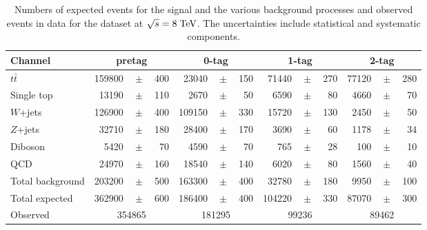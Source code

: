 \begin{table}
  \begin{tabular}{ l  rrr  rrr  rrr  rrr }
    \toprule
    Channel & \multicolumn{3}{c}{\ejets{} pretag} & \multicolumn{3}{c}{\ejets{} 0-tag} & \multicolumn{3}{c}{\ejets{} 1-tag} & \multicolumn{3}{c}{\ejets{} 2-tag} \\
    \midrule
    $t\bar{t}$       & 159800 &$\!\!\!\pm\!\!\!$& 400  & 23040 &$\!\!\!\pm\!\!\!$& 150  & 71440 &$\!\!\!\pm\!\!\!$& 270  & 77120 &$\!\!\!\pm\!\!\!$& 280  \\
    Single top       & 13190  &$\!\!\!\pm\!\!\!$& 110  & 2670  &$\!\!\!\pm\!\!\!$& 50  & 6590  &$\!\!\!\pm\!\!\!$& 80  & 4660  &$\!\!\!\pm\!\!\!$& 70   \\
    $W$+jets  & 126900 &$\!\!\!\pm\!\!\!$& 400 & 109150  &$\!\!\!\pm\!\!\!$& 330  & 15720 &$\!\!\!\pm\!\!\!$& 130  & 2450  &$\!\!\!\pm\!\!\!$& 50  \\
    $Z$+jets         & 32710  &$\!\!\!\pm\!\!\!$& 180  & 28400   &$\!\!\!\pm\!\!\!$& 170   & 3690  &$\!\!\!\pm\!\!\!$& 60  & 1178   &$\!\!\!\pm\!\!\!$& 34   \\
    Diboson          & 5420  &$\!\!\!\pm\!\!\!$& 70   & 4590  &$\!\!\!\pm\!\!\!$& 70 & 765 &$\!\!\!\pm\!\!\!$& 28 & 100  &$\!\!\!\pm\!\!\!$& 10 \\
    QCD       & 24970  &$\!\!\!\pm\!\!\!$& 160  & 18540  &$\!\!\!\pm\!\!\!$& 140  & 6020  &$\!\!\!\pm\!\!\!$& 80  & 1560   &$\!\!\!\pm\!\!\!$& 40  \\
    \midrule
    Total background & 203200 &$\!\!\!\pm\!\!\!$& 500 & 163300  &$\!\!\!\pm\!\!\!$& 400  & 32780 &$\!\!\!\pm\!\!\!$& 180 & 9950  &$\!\!\!\pm\!\!\!$& 100  \\
    \midrule
    Total expected   & 362900 &$\!\!\!\pm\!\!\!$& 600 & 186400 &$\!\!\!\pm\!\!\!$& 400  & 104220 &$\!\!\!\pm\!\!\!$& 330 & 87070 &$\!\!\!\pm\!\!\!$& 300  \\
    \midrule
    Observed         & \multicolumn{3}{c}{354865}     & \multicolumn{3}{c}{181295}     & \multicolumn{3}{c}{99236}     & \multicolumn{3}{c}{89462}     \\
    \bottomrule
  \end{tabular}
  \caption[Event yields for the \ejets{} samples at $\sqrt{s} = 8 \TeV{}$]{
    Numbers of expected events for the \ttbar{} signal and the various background 
    processes and observed events in data for the \ejets{} dataset
    at $\sqrt{s} = 8 \TeV{}$.
    The uncertainties include statistical and systematic components.}
  \label{tab:yields2012ele}
\end{table}
